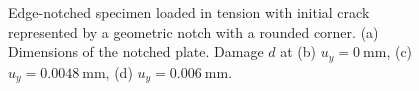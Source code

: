 \begin{figure}[htb!]
\begin{subfigure}[b]{0.06\textwidth}
    \vspace{0.15in}
  \end{subfigure}
  \caption[Edge-notched specimen loaded in tension with initial crack represented by a geometric notch with a rounded corner.]{Edge-notched specimen loaded in tension with initial crack represented by a geometric notch with a rounded corner.  (a) Dimensions of the notched plate. Damage $d$ at (b) $u_y = \SI{0}{\milli\meter}$, (c) $u_y = \SI{0.0048}{\milli\meter}$, (d) $u_y = \SI{0.006}{\milli\meter}$.}
  \label{fig: Chapter4/mode1_notched_plate}
\end{figure}
